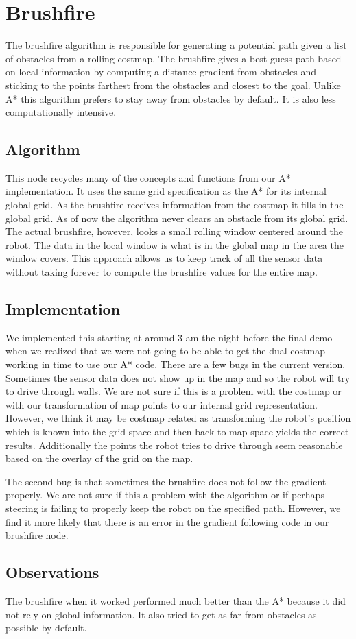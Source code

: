\section{Brushfire}

The brushfire algorithm is responsible for generating a potential path given a list of obstacles from a rolling costmap.  The brushfire gives a best guess path based on local information by computing a distance gradient from obstacles and sticking to the points farthest from the obstacles and closest to the goal.  Unlike A* this algorithm prefers to stay away from obstacles by default. It is also less computationally intensive.

\subsection{Algorithm}

This node recycles many of the concepts and functions from our A* implementation.  It uses the same grid specification as the A* for its internal global grid. As the brushfire receives information from the costmap it fills in the global grid. As of now the algorithm never clears an obstacle from its global grid. The actual brushfire, however, looks a small rolling window centered around the robot. The data in the local window is what is in the global map in the area the window covers. This approach allows us to keep track of all the sensor data without taking forever to compute the brushfire values for the entire map.

\subsection{Implementation}
We implemented this starting at around 3 am the night before the final demo when we realized that we were not going to be able to get the dual costmap working in time to use our A* code.  There are a few bugs in the current version. Sometimes the sensor data does not show up in the map and so the robot will try to drive through walls. We are not sure if this is a problem with the costmap or with our transformation of map points to our internal grid representation. However, we think it may be costmap related as transforming the robot's position which is known into the grid space and then back to map space yields the correct results. Additionally the points the robot tries to drive through seem reasonable based on the overlay of the grid on the map.

The second bug is that sometimes the brushfire does not follow the gradient properly. We are not sure if this a problem with the algorithm or if perhaps steering is failing to properly keep the robot on the specified path. However, we find it more likely that there is an error in the gradient following code in our brushfire node.

\subsection{Observations}
The brushfire when it worked performed much better than the A* because it did not rely on global information. It also tried to get as far from obstacles as possible by default.